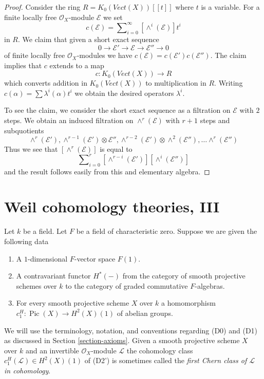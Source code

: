\documentclass{stacks-project}
\theoremstyle{plain}
\theoremstyle{definition}
\theoremstyle{remark}
\numberwithin{equation}{subsection}
\def\Pic{\mathop{\mathrm{Pic}}\nolimits}
\begin{document}
\begin{proof}
Consider the ring $R = K_0(\textit{Vect}(X))[[t]]$ where $t$ is a
variable. For a finite locally free $\mathcal{O}_X$-module
$\mathcal{E}$ we set
$$
c(\mathcal{E}) = \sum\nolimits_{i = 0}^\infty [\wedge^i(\mathcal{E})] t^i
$$
in $R$. We claim that given a short exact sequence
$$
0 \to \mathcal{E}' \to \mathcal{E} \to \mathcal{E}'' \to 0
$$
of finite locally free $\mathcal{O}_X$-modules
we have $c(\mathcal{E}) = c(\mathcal{E}') c(\mathcal{E}'')$.
The claim implies that $c$ extends to a map
$$
c :  K_0(\textit{Vect}(X)) \longrightarrow R
$$
which converts addition in $K_0(\textit{Vect}(X))$ to multiplication in $R$.
Writing $c(\alpha) = \sum \lambda^i(\alpha) t^i$ we obtain the desired
operators $\lambda^i$.

\medskip\noindent
To see the claim, we consider the short exact sequence as a
filtration on $\mathcal{E}$ with $2$ steps. We obtain an induced
filtration on $\wedge^r(\mathcal{E})$ with $r + 1$ steps and
subquotients
$$
\wedge^r(\mathcal{E}'),
\wedge^{r - 1}(\mathcal{E}') \otimes \mathcal{E}'',
\wedge^{r - 2}(\mathcal{E}') \otimes \wedge^2(\mathcal{E}''), \ldots
\wedge^r(\mathcal{E}'')
$$
Thus we see that $[\wedge^r(\mathcal{E})]$ is equal to
$$
\sum\nolimits_{i = 0}^r
[\wedge^{r - i}(\mathcal{E}')] [\wedge^i(\mathcal{E}'')]
$$
and the result follows easily from this and elementary algebra.
\end{proof}










\section{Weil cohomology theories, III}
\label{section-c1}

\noindent
Let $k$ be a field. Let $F$ be a field of characteristic zero.
Suppose we are given the following data
\begin{enumerate}
\item[(D0)] A $1$-dimensional $F$-vector space $F(1)$.
\item[(D1)] A contravariant functor $H^*(-)$ from the category of smooth
projective schemes over $k$ to the category of graded commutative
$F$-algebras.
\item[(D2')] For every smooth projective scheme $X$ over $k$ a homomorphism
$c_1^H : \Pic(X) \to H^2(X)(1)$ of abelian groups.
\end{enumerate}
We will use the terminology, notation, and conventions regarding
(D0) and (D1) as discussed in Section \ref{section-axioms}.
Given a smooth projective scheme $X$ over $k$ and an invertible
$\mathcal{O}_X$-module $\mathcal{L}$ the cohomology class
$c_1^H(\mathcal{L}) \in H^2(X)(1)$ of (D2')
is sometimes called the {\it first Chern class of $\mathcal{L}$
in cohomology}.
\end{document}
